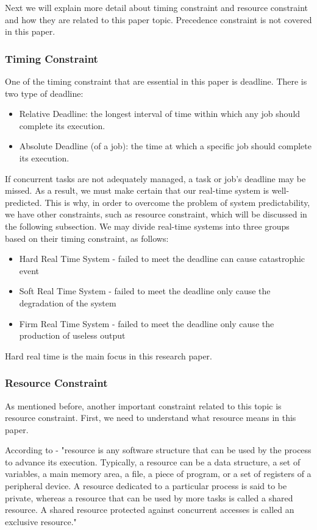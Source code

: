 Next we will explain more detail about timing constraint and resource constraint and how they are related to this paper topic. Precedence constraint is not covered in this paper. 

\subsubsection{Timing Constraint}

One of the timing constraint that are essential in this paper is deadline. There is two type of deadline:
\begin{itemize}
\item Relative Deadline: the longest interval of time within which any job should complete its execution\cite{b4}.
\item Absolute Deadline (of a job): the time at which a specific job should complete its execution\cite{b4}.
\end{itemize}

If concurrent tasks are not adequately managed, a task or job's deadline may be missed. As a result, we must make certain that our real-time system is well-predicted. This is why, in order to overcome the problem of system predictability, we have other constraints, such as resource constraint, which will be discussed in the following subsection. We may divide real-time systems into three groups based on their timing constraint, as follows:

\begin{itemize}
\item Hard Real Time System - failed to meet the deadline can cause catastrophic event 
\item Soft Real Time System - failed to meet the deadline only cause the degradation of the system 
\item Firm Real Time System - failed to meet the deadline only cause the production of useless output 
\end{itemize}
Hard real time is the main focus in this research paper.

\subsubsection{Resource Constraint}

As mentioned before, another important constraint related to this topic is resource constraint. First, we need to understand what resource means in this paper.

According to \cite{b5} - "resource is any software structure that can be used by the process to advance its execution. Typically, a resource can be a data structure, a set of variables, a main memory area, a file, a piece of program, or a set of registers of a peripheral device. A resource dedicated to a particular process is said to be private, whereas a resource that can be used by more tasks is called a shared resource. A shared resource protected against concurrent accesses is called an exclusive resource."



